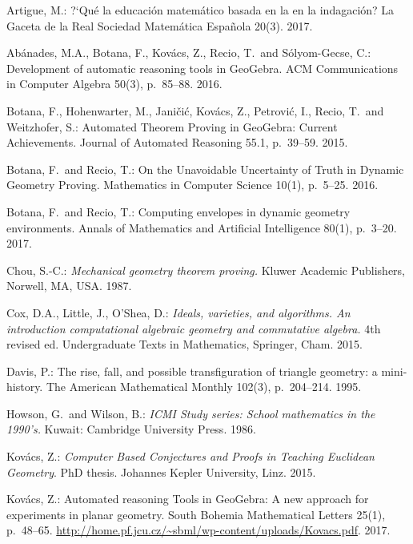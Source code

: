 \begin{thebibliography}{10}

Artigue, M.: ?`Qu\'e la educaci\'on matem\'atico basada en la
en la indagaci\'on? La Gaceta de la Real Sociedad Matem\'atica Espa\~nola 20(3). 2017.

Ab\'anades, M.A., Botana, F., Kov\'acs, Z., Recio, T.~and S\'olyom-Gecse, C.:
Development of automatic reasoning tools in GeoGebra.
ACM Communications in Computer Algebra 50(3), p.~85--88.
2016.

Botana, F., Hohenwarter, M., Jani\v{c}i\'c, Kov\'acs, Z., Petrovi\'c, I.,
Recio, T.~and Weitzhofer, S.: Automated Theorem Proving in GeoGebra: Current
Achievements. Journal of Automated Reasoning 55.1, p.~39--59. 2015.

Botana, F.~and Recio, T.: On the Unavoidable Uncertainty of Truth in Dynamic Geometry Proving.
Mathematics in Computer Science 10(1), p.~5--25. 2016.

Botana, F.~and Recio, T.:
Computing envelopes in dynamic geometry environments.
Annals of Mathematics and Artificial Intelligence 80(1), p.~3--20.
2017.

Chou, S.-C.: \textit{Mechanical geometry theorem proving.} Kluwer Academic Publishers,
Norwell, MA, USA. 1987.

Cox, D.A., Little, J., O'Shea, D.: \textit{Ideals, varieties, and algorithms.
An introduction computational algebraic geometry and commutative algebra.}
4th revised ed. Undergraduate Texts in Mathematics, Springer, Cham. 2015.

Davis, P.: The rise, fall, and possible transfiguration of triangle geometry: a mini-history.
The American Mathematical Monthly 102(3), p.~204--214. 1995.

Howson, G.~and Wilson, B.:
\textit{ICMI Study series: School mathematics in the 1990's.} Kuwait: Cambridge University Press. 1986.

Kov\'acs, Z.: \textit{Computer Based Conjectures and Proofs in Teaching Euclidean Geometry}.
PhD thesis. Johannes Kepler University, Linz. 2015.

Kov\'acs, Z.: Automated reasoning Tools in GeoGebra:
A new approach for experiments in planar geometry.
South Bohemia Mathematical Letters 25(1), p.~48--65.
\url{http://home.pf.jcu.cz/~sbml/wp-content/uploads/Kovacs.pdf}. 2017.


\end{thebibliography}
